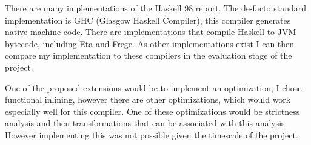 \documentclass[float=false, crop=false]{standalone}
\begin{document}
There are many implementations of the Haskell 98 report.
The de-facto standard implementation is GHC\cite{ghc} (Glasgow Haskell
Compiler), this compiler generates native machine code. There
are implementations that compile Haskell to JVM bytecode, including Eta\cite{eta}
and Frege\cite{frege}. As other implementations exist I can then 
compare my implementation to these compilers in the evaluation stage
of the project. 

One of the proposed extensions would be to implement an optimization,
I chose functional inlining, however there are other optimizations, which
would work especially well for this compiler. One of these
optimizations would be strictness analysis and
then transformations that can be associated with this analysis. 
However implementing this was not possible given the timescale of the project.



\end{document}
